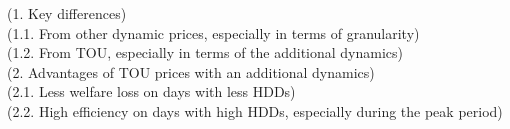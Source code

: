 (1. Key differences) \\ 
(1.1. From other dynamic prices, especially in terms of granularity) \\ 
(1.2. From TOU, especially in terms of the additional dynamics) \\

(2. Advantages of TOU prices with an additional dynamics) \\
(2.1. Less welfare loss on days with less HDDs) \\
(2.2. High efficiency on days with high HDDs, especially during the peak period) \\ 
